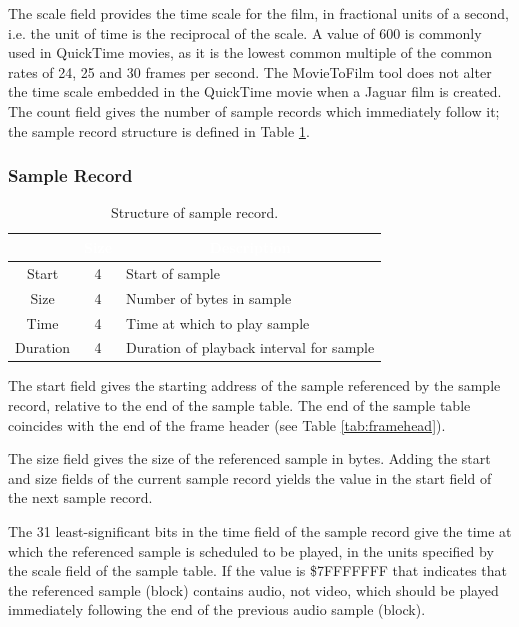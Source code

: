 \documentclass[12pt,letterpaper,twoside]{article}
\newcommand{\tabheadtxt}[1]{\multicolumn{1}{c}{\textcolor{white}{\textbf{#1}}}}
\begin{document}
The scale field provides the time scale for the film, in fractional units of a second, i.e. the unit of time is the reciprocal of the scale. A value of 600 is commonly used in QuickTime movies, as it is the lowest common multiple of the common rates of 24, 25 and 30 frames per second. The MovieToFilm tool does not alter the time scale embedded in the QuickTime movie when a Jaguar film is created. 
The count field gives the number of sample records which immediately follow it; the sample record structure is defined in Table \ref{tab:samplerec}.

\subsubsection{Sample Record}

\begin{table}[h]
\centering
\begin{tabular}{|c|c|p{9cm}|}
\hline
\rowcolor{black}
\tabheadtxt{Field} & \tabheadtxt{Size} & \tabheadtxt{Description} \\
\hline
Start & 4 & Start of sample\\
\hline
Size & 4 & Number of bytes in sample\\
\hline
Time & 4 & Time at which to play sample\\
\hline
Duration & 4 & Duration of playback interval for sample\\
\hline
\end{tabular}
\caption{Structure of sample record.}
\label{tab:samplerec}
\end{table}
\FloatBarrier

The start field gives the starting address of the sample referenced by the sample record, relative to the end of the sample table. The end of the sample table coincides with the end of the frame header (see Table \ref{tab:framehead}). 

The size field gives the size of the referenced sample in bytes. Adding the start and size fields of the current sample record yields the value in the start field of the next sample record. 

The 31 least-significant bits in the time field of the sample record give the time at which the referenced sample is scheduled to be played, in the units specified by the scale field of the sample table. If the value is \$7FFFFFFF that indicates that the referenced sample (block) contains audio, not video, which should be played immediately following the end of the previous audio sample (block). 
\end{document}
